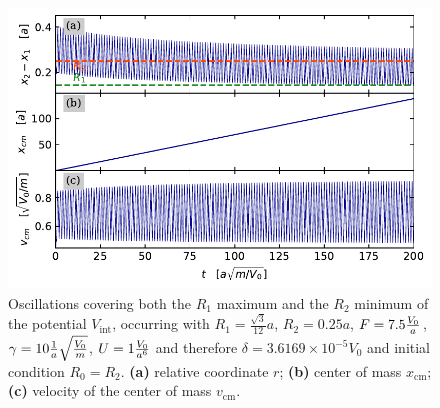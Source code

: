 \begin{figure}
\begin{center}
    \centering
    \includegraphics[width=1\linewidth]{Images/11_a_R_Xcm.pdf}
    \caption{Oscillations covering both the $R_1$ maximum and the $R_2$ minimum of the potential $V_\text{int}$, occurring with $R_1 = \frac{\sqrt{3}}{12} a$, $R_2 = 0.25 a$, $F = 7.5 \frac{V_0}{a}$, $\gamma = 10 \frac{1}{a}\sqrt{\frac{V_0}{m}}$, $ U = 1 \frac{V_0}{a^6}$ and therefore $\delta = 3.6169 \times 10^{-5} V_0$ and initial condition $R_0=R_2$. \textbf{(a)} relative coordinate $r$; \textbf{(b)} center of mass $x_\text{cm}$; \textbf{(c)} velocity of the center of mass $v_\text{cm}$. }
    \label{Fig:11_a_R_Xcm}
\end{center}
\end{figure}

